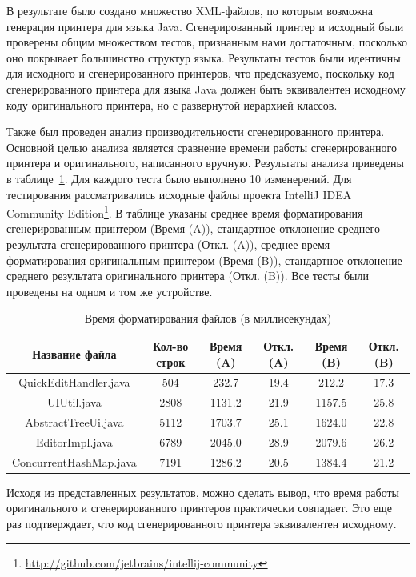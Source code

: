 В результате было создано множество XML-файлов, по которым возможна генерация принтера для языка Java. Сгенерированный принтер и исходный были проверены общим множеством тестов, признанным нами достаточным, посколько оно покрывает большинство структур языка. Результаты тестов были идентичны для исходного и сгенерированного принтеров, что предсказуемо, поскольку код сгенерированного принтера для языка Java должен быть эквивалентен исходному коду оригинального принтера, но с развернутой иерархией классов.

Также был проведен анализ производительности сгенерированного принтера. Основной целью анализа является сравнение времени работы сгенерированного принтера и оригинального, написанного вручную. Результаты анализа приведены в таблице~\ref{JavaPerformanceTbl}. Для каждого теста было выполнено 10 изменерений. Для тестирования рассматривались исходные файлы проекта IntelliJ IDEA Community Edition\footnote{\url{http://github.com/jetbrains/intellij-community}}.  В таблице указаны среднее время форматирования сгенерированным принтером (Время (A)), стандартное отклонение среднего результата сгенерированного принтера (Откл. (A)), среднее время форматирования оригинальным принтером (Время (B)), стандартное отклонение среднего результата оригинального принтера (Откл. (B)). Все тесты были проведены на одном и том же устройстве.

\begin{table}[H]
\begin{center}
{\scriptsize
\begin{tabular}{|c|c|c|c|c|c|}
\hline
Название файла & Кол-во строк & Время (A) & Откл. (A) & Время (B) & Откл. (B)\\
\hline
QuickEditHandler.java & 504 & 232.7 & 19.4 & 212.2 & 17.3\\
UIUtil.java & 2808 & 1131.2 & 21.9 & 1157.5 & 25.8\\
AbstractTreeUi.java & 5112 & 1703.7 & 25.1 & 1624.0 & 22.8\\
EditorImpl.java & 6789 & 2045.0 & 28.9 & 2079.6 & 26.2\\
ConcurrentHashMap.java & 7191 & 1286.2 & 20.5 & 1384.4 & 21.2\\
\hline
\end{tabular}}
\end{center}
\caption{\label{JavaPerformanceTbl}Время форматирования файлов (в миллисекундах)}
\end{table} 

Исходя из представленных результатов, можно сделать вывод, что время работы оригинального и сгенерированного принтеров практически совпадает. Это еще раз подтверждает, что код сгенерированного принтера эквивалентен исходному.

